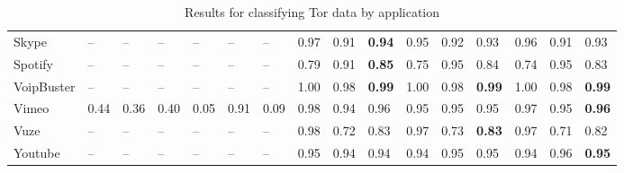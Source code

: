 \begin{table} [ht!]
{\begin{tabular} {|p{2cm}|p{0.7cm}p{0.7cm}p{0.7cm}|p{0.7cm}p{0.7cm}p{0.7cm}|p{0.7cm}p{0.7cm}p{0.7cm}|p{0.7cm}p{0.7cm}p{0.7cm}|p{0.7cm}p{0.7cm}p{0.7cm}|}
Skype & -- & -- & -- & -- & -- & -- & 0.97 & 0.91 & \textbf{0.94} & 0.95 & 0.92 & 0.93 & 0.96 & 0.91 & 0.93 \\
Spotify & -- & -- & -- & -- & -- & -- & 0.79 & 0.91 & \textbf{0.85} & 0.75 & 0.95 & 0.84 & 0.74 & 0.95 & 0.83 \\
VoipBuster & -- & -- & -- & -- & -- & -- & 1.00 & 0.98 & \textbf{0.99} & 1.00 & 0.98 & \textbf{0.99} & 1.00 & 0.98 & \textbf{0.99} \\
Vimeo & 0.44 & 0.36 & 0.40 & 0.05 & 0.91 & 0.09 & 0.98 & 0.94 & 0.96 & 0.95 & 0.95 & 0.95 & 0.97 & 0.95 & \textbf{0.96} \\
Vuze & -- & -- & -- & -- & -- & -- & 0.98 & 0.72 & 0.83 & 0.97 & 0.73 & \textbf{0.83} & 0.97 & 0.71 & 0.82 \\
Youtube & -- & -- & -- & -- & -- & -- & 0.95 & 0.94 & 0.94 & 0.94 & 0.95 & 0.95 & 0.94 & 0.96 & \textbf{0.95} \\
\hline
\end{tabular}}
\caption{Results for classifying Tor data by application}
\label{tab:torappresults}
\end{table}

